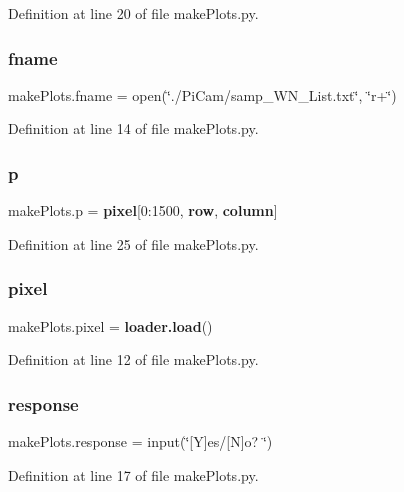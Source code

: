 Definition at line 20 of file make\+Plots.\+py.

\mbox{\label{namespacemake_plots_af312c1aadf11cc80fabb6bf4a274810f}} 
\subsubsection{fname}
{\footnotesize\ttfamily make\+Plots.\+fname = open(\char`\"{}./Pi\+Cam/samp\+\_\+\+W\+N\+\_\+\+List.\+txt\char`\"{}, \char`\"{}r+\char`\"{})}



Definition at line 14 of file make\+Plots.\+py.

\mbox{\label{namespacemake_plots_a61d267f01c1c4330fd51fa962e894819}} 
\subsubsection{p}
{\footnotesize\ttfamily make\+Plots.\+p = \textbf{ pixel}[0\+:1500, \textbf{ row}, \textbf{ column}]}



Definition at line 25 of file make\+Plots.\+py.

\mbox{\label{namespacemake_plots_a83501c6e82595683eecd94e9e736cfc1}} 
\subsubsection{pixel}
{\footnotesize\ttfamily make\+Plots.\+pixel = \textbf{ loader.\+load}()}



Definition at line 12 of file make\+Plots.\+py.

\mbox{\label{namespacemake_plots_afec3d8c2a05ac628742a7d47511493cd}} 
\subsubsection{response}
{\footnotesize\ttfamily make\+Plots.\+response = input(\char`\"{}[Y]es/[N]o? \char`\"{})}



Definition at line 17 of file make\+Plots.\+py.

\mbox{\label{namespacemake_plots_a38951a02f9e689d1764503491e4b0d58}} 
